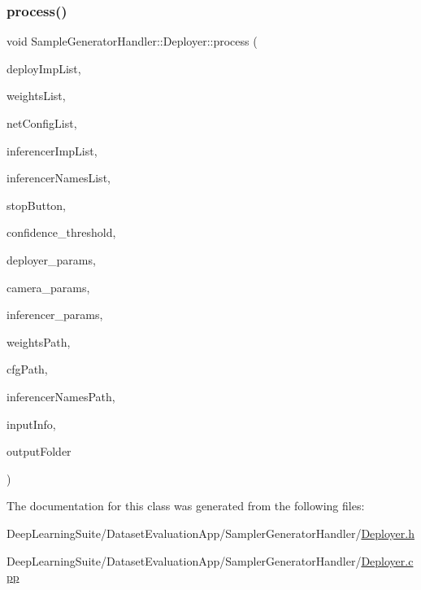 \subsubsection{\texorpdfstring{process()}{process()}}
{\footnotesize\ttfamily void Sample\+Generator\+Handler\+::\+Deployer\+::process (\begin{DoxyParamCaption}\item[{Q\+List\+View $\ast$}]{deploy\+Imp\+List,  }\item[{Q\+List\+View $\ast$}]{weights\+List,  }\item[{Q\+List\+View $\ast$}]{net\+Config\+List,  }\item[{Q\+List\+View $\ast$}]{inferencer\+Imp\+List,  }\item[{Q\+List\+View $\ast$}]{inferencer\+Names\+List,  }\item[{bool $\ast$}]{stop\+Button,  }\item[{double $\ast$}]{confidence\+\_\+threshold,  }\item[{Q\+Group\+Box $\ast$}]{deployer\+\_\+params,  }\item[{Q\+Group\+Box $\ast$}]{camera\+\_\+params,  }\item[{Q\+Group\+Box $\ast$}]{inferencer\+\_\+params,  }\item[{const std\+::string \&}]{weights\+Path,  }\item[{const std\+::string \&}]{cfg\+Path,  }\item[{const std\+::string \&}]{inferencer\+Names\+Path,  }\item[{const std\+::string \&}]{input\+Info,  }\item[{const std\+::string \&}]{output\+Folder }\end{DoxyParamCaption})\hspace{0.3cm}{\ttfamily [static]}}



The documentation for this class was generated from the following files\+:\begin{DoxyCompactItemize}
\item 
Deep\+Learning\+Suite/\+Dataset\+Evaluation\+App/\+Sampler\+Generator\+Handler/\hyperlink{_deployer_8h}{Deployer.\+h}\item 
Deep\+Learning\+Suite/\+Dataset\+Evaluation\+App/\+Sampler\+Generator\+Handler/\hyperlink{_deployer_8cpp}{Deployer.\+cpp}\end{DoxyCompactItemize}
